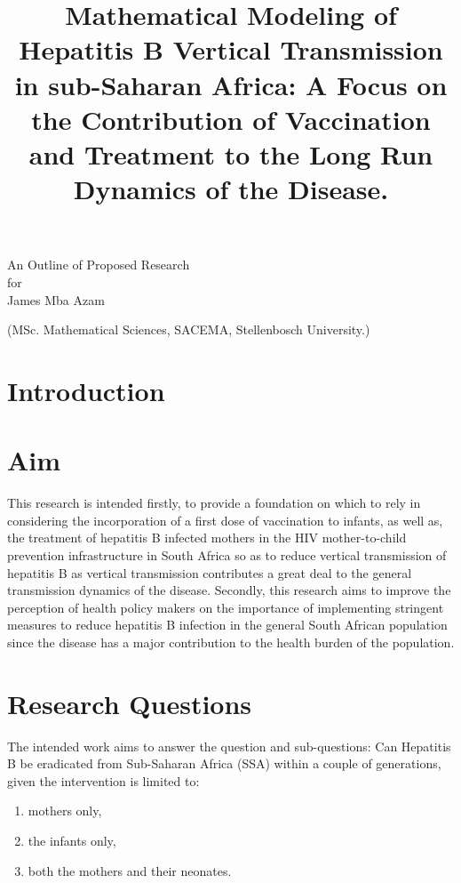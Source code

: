 \documentclass[11pt,a4paper]{article}
\begin{document}
\begin{titlepage}
		\title{Mathematical Modeling of Hepatitis B Vertical Transmission in sub-Saharan Africa: A Focus on the Contribution of Vaccination and Treatment to the Long Run Dynamics of the Disease.}
		\maketitle
		\begin{center}
			An Outline of Proposed Research\\ for\\ James Mba Azam\\
		\end{center}
		\begin{center}
			(MSc. Mathematical Sciences, SACEMA, Stellenbosch University.)
		\end{center}
	
\end{titlepage}
\section*{Introduction}

\section{Aim}
This research is intended firstly, to provide a foundation on which to rely in considering the incorporation of a first dose of vaccination to infants, as well as, the treatment of hepatitis B infected mothers in the HIV mother-to-child prevention infrastructure in South Africa so as to reduce vertical transmission of hepatitis B as vertical transmission contributes a great deal to the general transmission dynamics of the disease. Secondly, this research aims to improve the perception of health policy makers on the importance of implementing stringent measures to reduce hepatitis B infection in the general South African population since the disease has a major contribution to the health burden of the population.

\section{Research Questions}
The intended work aims to answer the question and sub-questions: \label{section: research question}
Can Hepatitis B be eradicated from Sub-Saharan Africa (SSA) within a couple of generations, given the intervention is limited to: 
	\begin{enumerate} 
		\item mothers only, 
		\item the infants only,
		\item both the mothers and their neonates.
	\end{enumerate}
\end{document}
